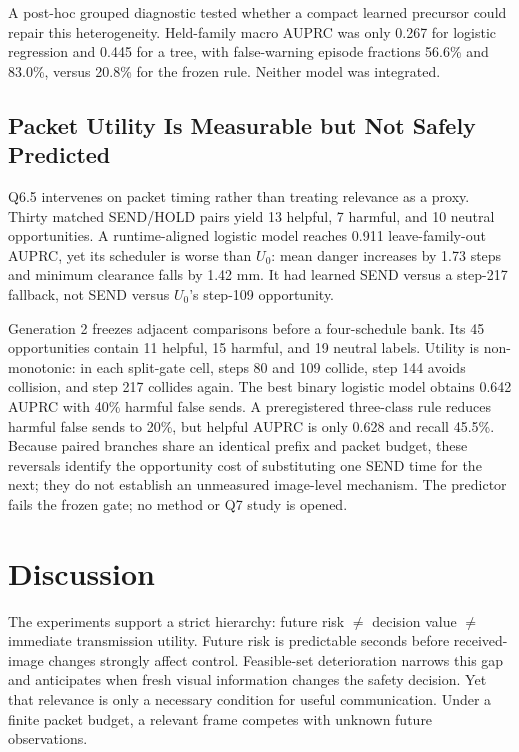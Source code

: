 \documentclass[letterpaper,10pt,conference]{ieeeconf}
\begin{document}
A post-hoc grouped diagnostic tested whether a compact learned precursor could
repair this heterogeneity. Held-family macro AUPRC was only 0.267 for logistic
regression and 0.445 for a tree, with false-warning episode fractions 56.6\%
and 83.0\%, versus 20.8\% for the frozen rule. Neither model was integrated.

\subsection{Packet Utility Is Measurable but Not Safely Predicted}
Q6.5 intervenes on packet timing rather than treating relevance as a proxy.
Thirty matched SEND/HOLD pairs yield 13 helpful, 7 harmful, and 10 neutral
opportunities. A runtime-aligned logistic model reaches 0.911
leave-family-out AUPRC, yet its scheduler is worse than $U_0$: mean danger
increases by 1.73 steps and minimum clearance falls by 1.42 mm. It had learned
SEND versus a step-217 fallback, not SEND versus $U_0$'s step-109 opportunity.

Generation 2 freezes adjacent comparisons before a four-schedule bank. Its 45
opportunities contain 11 helpful, 15 harmful, and 19 neutral labels. Utility is
non-monotonic: in each split-gate cell, steps 80 and 109 collide, step 144
avoids collision, and step 217 collides again. The best binary logistic model
obtains 0.642 AUPRC with 40\% harmful false sends. A preregistered three-class
rule reduces harmful false sends to 20\%, but helpful AUPRC is only 0.628 and
recall 45.5\%. Because paired branches share an identical prefix and packet
budget, these reversals identify the opportunity cost of substituting one SEND
time for the next; they do not establish an unmeasured image-level mechanism.
The predictor fails the frozen gate; no method or Q7 study is opened.

\section{Discussion}

The experiments support a strict hierarchy: future risk $\neq$ decision value
$\neq$ immediate transmission utility.
Future risk is predictable seconds before received-image changes strongly
affect control. Feasible-set deterioration narrows this gap and anticipates
when fresh visual information changes the safety decision. Yet that relevance
is only a necessary condition for useful communication. Under a finite packet
budget, a relevant frame competes with unknown future observations.
\end{document}
